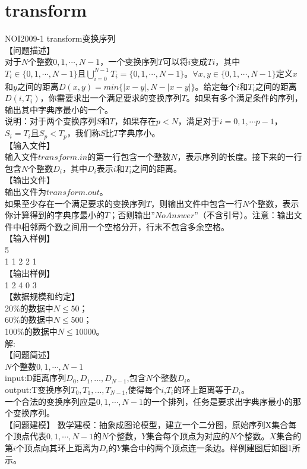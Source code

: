 \documentclass[12pt,twiside,a4paper]{ctexbook}
\numberwithin{chapter}{part}
\begin{document}
\section{transform}
NOI2009-1 transform变换序列\\
【问题描述】\\    
对于$N$个整数$0, 1,\cdots, N-1$，一个变换序列$T$可以将$i$变成$Ti$，其中$T_{i}\in\{0,1,\cdots,N-1\}$且$\bigcup_{i=0}^{N-1}{T_i}=\{0,1,\cdots,N-1\}$。$\forall x,y\in\{0,1,\cdots,N-1\}$定义$x$和$y$之间的距离$D(x,y) = min\{|x - y|, N - |x - y|\}$。给定每个$i$和$T_i$之间的距离$D(i,T_i)$，你需要求出一个满足要求的变换序列$T$。如果有多个满足条件的序列，输出其中字典序最小的一个。\\
说明：对于两个变换序列$S$和$T$，如果存在$p<N$，满足对于$i=0,1,\cdots p-1$，$S_i=T_i$且$S_p<T_p$，我们称$S$比$T$字典序小。\\
【输入文件】\\
输入文件$transform.in$的第一行包含一个整数$N$，表示序列的长度。接下来的一行包含$N$个整数$D_i$，其中$D_i$表示$i$和$T_i$之间的距离。\\
【输出文件】\\
输出文件为$transform.out$。\\
如果至少存在一个满足要求的变换序列$T$，则输出文件中包含一行$N$个整数，表示你计算得到的字典序最小的$T$；否则输出$”No Answer”$（不含引号）。注意：输出文件中相邻两个数之间用一个空格分开，行末不包含多余空格。\\
【输入样例】\\
5\\
1 1 2 2 1\\
【输出样例】\\
1 2 4 0 3\\
【数据规模和约定】\\
20\%的数据中$N\leq50$；\\
60\%的数据中$N\leq500$；\\
100\%的数据中$N\leq10000$。\\
解:\\
【问题简述】\\
$N$个整数$0,1,\cdots,N-1$\\
input:D距离序列$D_0,D_1,…,D_{N-1}$,包含$N$个整数$D_i$。\\
output:T变换序列$T_0,T_1,…,T_{N-1}$,使得每个$i$,$T_i$的环上距离等于$D_i$。\\
一个合法的变换序列应是$0,1,\cdots,N-1$的一个排列，任务是要求出字典序最小的那个变换序列。\\
【问题建模】
数学建模：抽象成图论模型，建立一个二分图，原始序列X集合每个顶点代表$0,1,\cdots,N-1$的$N$个整数，$Y$集合每个顶点为对应的$N$个整数。$X$集合的第$i$个顶点向其环上距离为$D_i$的$Y$集合中的两个顶点连一条边。样例建图后如图1所示。\\
\end{document}
